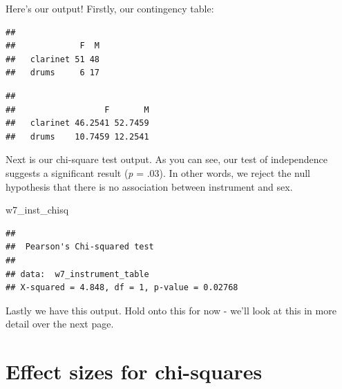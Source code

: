 \documentclass[
]{book}
\newenvironment{Shaded}{\begin{snugshade}}{\end{snugshade}}
\newcommand{\AttributeTok}[1]{\textcolor[rgb]{0.13,0.29,0.53}{#1}}
\newcommand{\ConstantTok}[1]{\textcolor[rgb]{0.56,0.35,0.01}{#1}}
\newcommand{\FunctionTok}[1]{\textcolor[rgb]{0.13,0.29,0.53}{\textbf{#1}}}
\newcommand{\NormalTok}[1]{#1}
\newcommand{\OtherTok}[1]{\textcolor[rgb]{0.56,0.35,0.01}{#1}}
\newcommand{\SpecialCharTok}[1]{\textcolor[rgb]{0.81,0.36,0.00}{\textbf{#1}}}
\begin{document}
Here's our output! Firstly, our contingency table:

\begin{Shaded}
\end{Shaded}

\begin{verbatim}
##           
##             F  M
##   clarinet 51 48
##   drums     6 17
\end{verbatim}

\begin{Shaded}
\end{Shaded}

\begin{verbatim}
##           
##                  F       M
##   clarinet 46.2541 52.7459
##   drums    10.7459 12.2541
\end{verbatim}

Next is our chi-square test output. As you can see, our test of independence suggests a significant result (\emph{p} = .03). In other words, we reject the null hypothesis that there is no association between instrument and sex.

\begin{Shaded}
\begin{Highlighting}[]
\NormalTok{w7\_inst\_chisq}
\end{Highlighting}
\end{Shaded}

\begin{verbatim}
## 
##  Pearson's Chi-squared test
## 
## data:  w7_instrument_table
## X-squared = 4.848, df = 1, p-value = 0.02768
\end{verbatim}

Lastly we have this output. Hold onto this for now - we'll look at this in more detail over the next page.

\hypertarget{effect-sizes-for-chi-squares}{%
\section{Effect sizes for chi-squares}\label{effect-sizes-for-chi-squares}}
\end{document}
